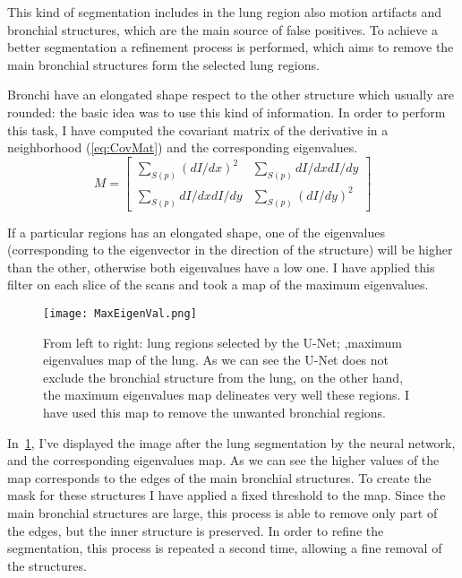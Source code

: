 \documentclass{standalone}
\begin{document}
	This kind of segmentation includes in the lung region also motion artifacts and bronchial structures, which are the main source of false positives. To achieve a better segmentation a refinement process is performed, which aims to remove the main bronchial structures form the selected lung regions. 

	Bronchi have an elongated shape respect to the other structure which usually are rounded: the basic idea was to use this kind of information. In order to perform this task, I have  computed the covariant matrix of the derivative in a neighborhood (\ref{eq:CovMat}) and the corresponding eigenvalues. 
	\begin{equation}\label{eq:CovMat}
		M = \begin{bmatrix} \sum _{S(p)}(dI/dx)^2 & \sum _{S(p)}dI/dx dI/dy \\ \sum _{S(p)}dI/dx dI/dy & \sum _{S(p)}(dI/dy)^2 \end{bmatrix}
	\end{equation}
	
	If a particular regions has an elongated shape, one of the eigenvalues (corresponding to the eigenvector in the direction of the structure) will be higher than the other, otherwise both eigenvalues have a low one. I have applied this filter on each slice of the scans and took a map of the maximum eigenvalues. 
	\begin{figure}[h!]
		\centering
			\texttt{[image: MaxEigenVal.png]}
		\caption{From left to right: lung regions selected by the U-Net; ,maximum eigenvalues map of the lung. As we can see the U-Net does not exclude the bronchial structure from the lung, on the other hand, the maximum eigenvalues map delineates very well these regions. I have used this map to remove the unwanted bronchial regions.}\label{fig:MaxEigenval}
	\end{figure}

	In \figurename\,\ref{fig:MaxEigenval}, I've displayed the image after the lung segmentation by the neural network, and the corresponding eigenvalues map. As we can see the higher values of the map corresponds to the edges of the main bronchial structures. To create the mask for these structures I have applied a fixed threshold to the map. Since the main bronchial structures are large, this process is able to remove only part of the edges, but the inner structure is preserved. In order to refine the segmentation, this process is repeated a second time, allowing a fine removal of the structures.
\end{document}
